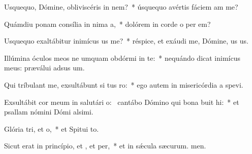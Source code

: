 \item Usquequo, Dómine, obliviscéris  in nem?~* úsquequo avértis fáciem am  me?
\item Quámdiu ponam consília in nima a,~* dolórem in corde o per em?
\item Usquequo exaltábitur inimícus us  me?~* réspice, et exáudi me, Dómine, us us.
\item Illúmina óculos meos ne umquam obdórmi in te:~* nequándo dicat inimícus meus: præválui adsus um.
\item Qui tríbulant me, exsultábunt si tus ro:~* ego autem in misericórdia a spevi.
\item Exsultábit cor meum in salutári o:~\pscross{} cantábo Dómino qui bona buit hi:~* et psallam nómini Dómi alsimi.
\item Glória tri, et o,~* et Spitui to.
\item Sicut erat in princípio, et , et per,~* et in sǽcula sæcurum. men.

